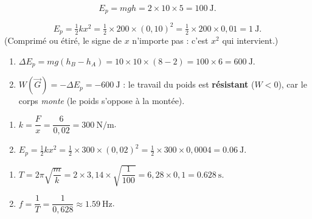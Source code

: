 \documentclass[11pt,a4paper]{article}
\newcommand{\vv}[1]{\vec{#1}}\newcommand{\ds}{\displaystyle}
\begin{document}

\begin{corrige}
\[
E_p=mgh=2\times10\times5=\qty{100}{\joule}.
\]
\end{corrige}

\begin{corrige}
\[
E_p=\tfrac12 k x^2=\tfrac12\times200\times(0,10)^2=\tfrac12\times200\times0,01=\qty{1}{\joule}.
\]
(Comprimé ou étiré, le signe de $x$ n'importe pas : c'est $x^2$ qui intervient.)
\end{corrige}

\begin{corrige}
\begin{enumerate}[label=\alph*)]
  \item $\Delta E_p=mg(h_B-h_A)=10\times10\times(8-2)=100\times6=\qty{600}{\joule}$.
  \item $W(\vv G)=-\Delta E_p=\qty{-600}{\joule}$ : le travail du poids est \textbf{résistant}
        ($W<0$), car le corps \emph{monte} (le poids s'oppose à la montée).
\end{enumerate}
\end{corrige}

\begin{corrige}
\begin{enumerate}[label=\alph*)]
  \item $k=\dfrac{F}{x}=\dfrac{6}{0,02}=\qty{300}{\newton\per\metre}$.
  \item $E_p=\tfrac12 k x^2=\tfrac12\times300\times(0,02)^2=\tfrac12\times300\times0,0004=\qty{0,06}{\joule}$.
\end{enumerate}
\end{corrige}

\begin{corrige}
\begin{enumerate}[label=\alph*)]
  \item $T=2\pi\sqrt{\dfrac{m}{k}}=2\times3,14\times\sqrt{\dfrac{1}{100}}=6,28\times0,1=\qty{0,628}{\second}$.
  \item $f=\dfrac1T=\dfrac{1}{0,628}\approx\qty{1,59}{\hertz}$.
\end{enumerate}
\end{corrige}
\end{document}
